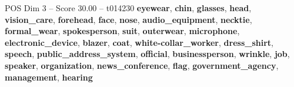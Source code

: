 \begin{textsample}{POS Dim 3 – Score 30.00 – t014230}  \label{ex:f3_pos_034}
\textbf{eyewear}, \textbf{chin}, \textbf{glasses}, \textbf{head}, \textbf{vision\_care}, \textbf{forehead}, \textbf{face}, \textbf{nose}, \textbf{audio\_equipment}, \textbf{necktie}, \textbf{formal\_wear}, \textbf{spokesperson}, \textbf{suit}, \textbf{outerwear}, \textbf{microphone}, \textbf{electronic\_device}, \textbf{blazer}, \textbf{coat}, \textbf{white-collar\_worker}, \textbf{dress\_shirt}, \textbf{speech}, \textbf{public\_address\_system}, \textbf{official}, \textbf{businessperson}, \textbf{wrinkle}, \textbf{job}, \textbf{speaker}, \textbf{organization}, \textbf{news\_conference}, \textbf{flag}, \textbf{government\_agency}, \textbf{management}, \textbf{hearing}

\end{textsample}
